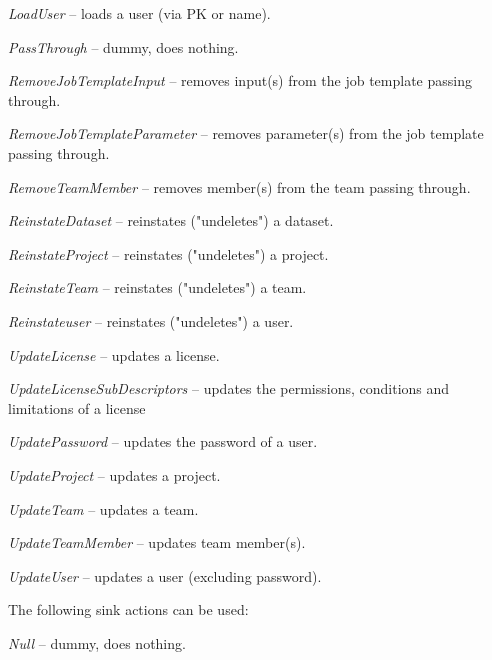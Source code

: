 \documentclass[a4paper]{book}
\begin{document}
\begin{tight_itemize}
  \item \textit{LoadUser} -- loads a user (via PK or name).
  \item \textit{PassThrough} -- dummy, does nothing.
  \item \textit{RemoveJobTemplateInput} -- removes input(s) from the job template passing through.
  \item \textit{RemoveJobTemplateParameter} -- removes parameter(s) from the job template passing through.
  \item \textit{RemoveTeamMember} -- removes member(s) from the team passing through.
  \item \textit{ReinstateDataset} -- reinstates ("undeletes") a dataset.
  \item \textit{ReinstateProject} -- reinstates ("undeletes") a project.
  \item \textit{ReinstateTeam} -- reinstates ("undeletes") a team.
  \item \textit{Reinstateuser} -- reinstates ("undeletes") a user.
  \item \textit{UpdateLicense} -- updates a license.
  \item \textit{UpdateLicenseSubDescriptors} -- updates the permissions, conditions and limitations of a license
  \item \textit{UpdatePassword} -- updates the password of a user.
  \item \textit{UpdateProject} -- updates a project.
  \item \textit{UpdateTeam} -- updates a team.
  \item \textit{UpdateTeamMember} -- updates team member(s).
  \item \textit{UpdateUser} -- updates a user (excluding password).
\end{tight_itemize}
The following sink actions can be used:
\begin{tight_itemize}
  \item \textit{Null} -- dummy, does nothing.
\end{tight_itemize}
\end{document}
